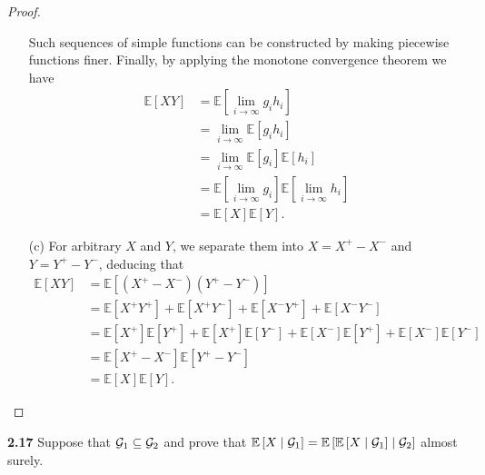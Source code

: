 \begin{proof}
\begin{enumerate}
        Such sequences of simple functions can be constructed by making piecewise functions finer.
        Finally, by applying the monotone convergence theorem we have
        \begin{equation*}
            \begin{aligned}
                \mathbb{E}[XY]
                &= \mathbb{E}[\lim_{i \rightarrow \infty} g_i h_i]\\
                &= \lim_{i \rightarrow \infty} \mathbb{E}[g_i h_i]\\
                &= \lim_{i \rightarrow \infty} \mathbb{E}[g_i] \mathbb{E}[h_i]\\
                &= \mathbb{E}[\lim_{i \rightarrow \infty} g_i] \mathbb{E}[\lim_{i \rightarrow \infty} h_i]\\
                &= \mathbb{E}[X] \mathbb{E}[Y].
            \end{aligned}
        \end{equation*}

        \item[(c)] For arbitrary $X$ and $Y$, we separate them into $X = X^+ - X^-$ and $Y = Y^+ - Y^-$, deducing that
        \begin{equation*}
            \begin{aligned}
                \mathbb{E}[XY]
                &= \mathbb{E}[(X^+ - X^-)(Y^+ - Y^-)]\\
                &= \mathbb{E}[X^+ Y^+] + \mathbb{E}[X^+ Y^-] + \mathbb{E}[X^- Y^+] + \mathbb{E}[X^- Y^-]\\
                &= \mathbb{E}[X^+]\mathbb{E}[Y^+] + \mathbb{E}[X^+]\mathbb{E}[Y^-] + \mathbb{E}[X^-]\mathbb{E}[Y^+] + \mathbb{E}[X^-]\mathbb{E}[Y^-]\\
                &= \mathbb{E}[X^+ - X^-] \mathbb{E}[Y^+ - Y^-]\\
                &= \mathbb{E}[X] \mathbb{E}[Y].
            \end{aligned}
        \end{equation*} 
    \end{enumerate}
\end{proof}

\noindent\textbf{2.17} Suppose that $\mathcal{G}_1 \subseteq \mathcal{G}_2$ and prove that $\mathbb{E} \left[X \mid \mathcal{G}_1\right]=\mathbb{E} \left[ \mathbb{E} \left[X\mid \mathcal{G}_1\right] \mid \mathcal{G}_2 \right]$ almost surely. 

